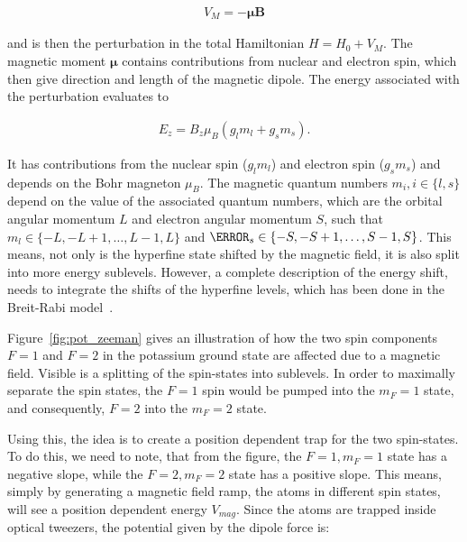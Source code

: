 \begin{align}
	V_M = - \bm{\mu} \bm{B}
\end{align}

and is then the perturbation in the total Hamiltonian $H = H_0 + V_M$. The magnetic moment $\bm{\mu}$ contains contributions from nuclear and electron spin, which then give direction and length of the magnetic dipole. The energy associated with the perturbation evaluates to

\begin{align}
	E_z = B_z \mu_B \left(g_l m_l + g_s m_s\right).
\end{align}

It has contributions from the nuclear spin ($g_l m_l$) and electron spin ($g_s m_s$) and depends on the Bohr magneton $\mu_B$. The magnetic quantum numbers $m_i, i\in\{l,s\}$ depend on the value of the associated quantum numbers, which are the orbital angular momentum $L$ and electron angular momentum $S$, such that $m_l \in \{-L, -L+1, \ldots, L-1, L\}$ and $\m_s \in \{-S, -S+1, \ldots, S-1, S\}$. This means, not only is the hyperfine state shifted by the magnetic field, it is also split into more energy sublevels. However, a complete description of the energy shift, needs to integrate the shifts of the hyperfine levels, which has been done in the Breit-Rabi model~\cite{Breit1931}.

Figure~\ref{fig:pot_zeeman} gives an illustration of how the two spin components $F=1$ and $F=2$ in the potassium ground state are affected due to a magnetic field. Visible is a splitting of the spin-states into sublevels. In order to maximally separate the spin states, the $F=1$ spin would be pumped into the $m_F=1$ state, and consequently, $F=2$ into the $m_F=2$ state.


Using this, the idea is to create a position dependent trap for the two spin-states. To do this, we need to note, that from the figure, the $F=1, m_F=1$ state has a negative slope, while the $F=2, m_F=2$ state has a positive slope. This means, simply by generating a magnetic field ramp, the atoms in different spin states, will see a position dependent energy $V_{mag}$. Since the atoms are trapped inside optical tweezers, the potential given by the dipole force is:

